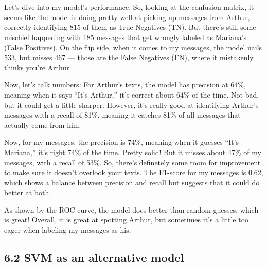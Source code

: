 \documentclass[11pt]{article}
\begin{document}
    \begin{center}
    \end{center}
    { \hspace*{\fill} \\}
    
    \begin{center}
    \end{center}
    { \hspace*{\fill} \\}
    
    Let's dive into my model's performance. So, looking at the confusion
matrix, it seems like the model is doing pretty well at picking up
messages from Arthur, correctly identifying 815 of them as True
Negatives (TN). But there's still some mischief happening with 185
messages that get wrongly labeled as Mariana's (False Positives). On the
flip side, when it comes to my messages, the model nails 533, but misses
467 --- those are the False Negatives (FN), where it mistakenly thinks
you're Arthur.

Now, let's talk numbers: For Arthur's texts, the model has precision at
64\%, meaning when it says ``It's Arthur,'' it's correct about 64\% of
the time. Not bad, but it could get a little sharper. However, it's
really good at identifying Arthur's messages with a recall of 81\%,
meaning it catches 81\% of all messages that actually come from him.

Now, for my messages, the precision is 74\%, meaning when it guesses
``It's Mariana,'' it's right 74\% of the time. Pretty solid! But it
misses about 47\% of my messages, with a recall of 53\%. So, there's
definetely some room for improvement to make sure it doesn't overlook
your texts. The F1-score for my messages is 0.62, which shows a balance
between precision and recall but suggests that it could do better at
both.

As shown by the ROC curve, the model does better than random guesses,
which is great! Overall, it is great at spotting Arthur, but sometimes
it's a little too eager when labeling my messages as his.

    \subsection{6.2 SVM as an alternative
model}\label{svm-as-an-alternative-model}
\end{document}
